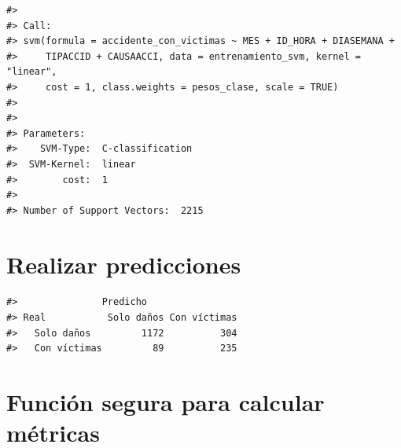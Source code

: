 \documentclass[
  spanish,
  10.5pt,
  letterpaper,
  openany,
  headings=big]{scrbook}
\newenvironment{Shaded}{}{}
\newcommand{\AttributeTok}[1]{\textcolor[rgb]{0.84,0.23,0.29}{#1}}
\newcommand{\FunctionTok}[1]{\textcolor[rgb]{0.44,0.26,0.76}{#1}}
\newcommand{\NormalTok}[1]{\textcolor[rgb]{0.14,0.16,0.18}{#1}}
\newcommand{\OtherTok}[1]{\textcolor[rgb]{0.44,0.26,0.76}{#1}}
\newcommand{\SpecialCharTok}[1]{\textcolor[rgb]{0.00,0.36,0.77}{#1}}
\begin{document}
\begin{verbatim}
#> 
#> Call:
#> svm(formula = accidente_con_victimas ~ MES + ID_HORA + DIASEMANA + 
#>     TIPACCID + CAUSAACCI, data = entrenamiento_svm, kernel = "linear", 
#>     cost = 1, class.weights = pesos_clase, scale = TRUE)
#> 
#> 
#> Parameters:
#>    SVM-Type:  C-classification 
#>  SVM-Kernel:  linear 
#>        cost:  1 
#> 
#> Number of Support Vectors:  2215
\end{verbatim}

\section{Realizar predicciones}\label{realizar-predicciones}

\begin{Shaded}
\end{Shaded}

\begin{verbatim}
#>               Predicho
#> Real           Solo daños Con víctimas
#>   Solo daños         1172          304
#>   Con víctimas         89          235
\end{verbatim}

\section{Función segura para calcular
métricas}\label{funciuxf3n-segura-para-calcular-muxe9tricas}
\end{document}
